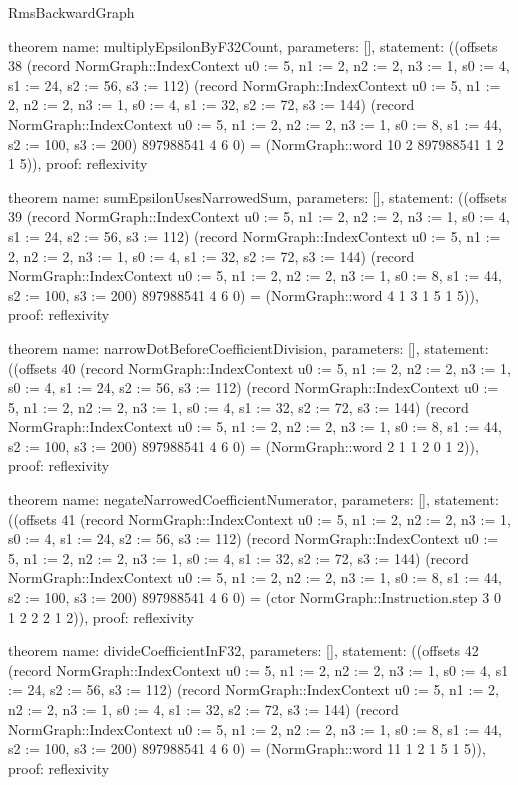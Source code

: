 \begin{lexlean}{RmsBackwardGraph}
\begin{semanticmodule}
theorem{
  name: multiplyEpsilonByF32Count,
  parameters: [],
  statement: ((offsets 38 (record NormGraph::IndexContext {u0 := 5, n1 := 2, n2 := 2, n3 := 1, s0 := 4, s1 := 24, s2 := 56, s3 := 112}) (record NormGraph::IndexContext {u0 := 5, n1 := 2, n2 := 2, n3 := 1, s0 := 4, s1 := 32, s2 := 72, s3 := 144}) (record NormGraph::IndexContext {u0 := 5, n1 := 2, n2 := 2, n3 := 1, s0 := 8, s1 := 44, s2 := 100, s3 := 200}) 897988541 4 6 0) = (NormGraph::word 10 2 897988541 1 2 1 5)),
  proof: reflexivity{}
}

theorem{
  name: sumEpsilonUsesNarrowedSum,
  parameters: [],
  statement: ((offsets 39 (record NormGraph::IndexContext {u0 := 5, n1 := 2, n2 := 2, n3 := 1, s0 := 4, s1 := 24, s2 := 56, s3 := 112}) (record NormGraph::IndexContext {u0 := 5, n1 := 2, n2 := 2, n3 := 1, s0 := 4, s1 := 32, s2 := 72, s3 := 144}) (record NormGraph::IndexContext {u0 := 5, n1 := 2, n2 := 2, n3 := 1, s0 := 8, s1 := 44, s2 := 100, s3 := 200}) 897988541 4 6 0) = (NormGraph::word 4 1 3 1 5 1 5)),
  proof: reflexivity{}
}

theorem{
  name: narrowDotBeforeCoefficientDivision,
  parameters: [],
  statement: ((offsets 40 (record NormGraph::IndexContext {u0 := 5, n1 := 2, n2 := 2, n3 := 1, s0 := 4, s1 := 24, s2 := 56, s3 := 112}) (record NormGraph::IndexContext {u0 := 5, n1 := 2, n2 := 2, n3 := 1, s0 := 4, s1 := 32, s2 := 72, s3 := 144}) (record NormGraph::IndexContext {u0 := 5, n1 := 2, n2 := 2, n3 := 1, s0 := 8, s1 := 44, s2 := 100, s3 := 200}) 897988541 4 6 0) = (NormGraph::word 2 1 1 2 0 1 2)),
  proof: reflexivity{}
}

theorem{
  name: negateNarrowedCoefficientNumerator,
  parameters: [],
  statement: ((offsets 41 (record NormGraph::IndexContext {u0 := 5, n1 := 2, n2 := 2, n3 := 1, s0 := 4, s1 := 24, s2 := 56, s3 := 112}) (record NormGraph::IndexContext {u0 := 5, n1 := 2, n2 := 2, n3 := 1, s0 := 4, s1 := 32, s2 := 72, s3 := 144}) (record NormGraph::IndexContext {u0 := 5, n1 := 2, n2 := 2, n3 := 1, s0 := 8, s1 := 44, s2 := 100, s3 := 200}) 897988541 4 6 0) = (ctor NormGraph::Instruction.step 3 0 1 2 2 2 1 2)),
  proof: reflexivity{}
}

theorem{
  name: divideCoefficientInF32,
  parameters: [],
  statement: ((offsets 42 (record NormGraph::IndexContext {u0 := 5, n1 := 2, n2 := 2, n3 := 1, s0 := 4, s1 := 24, s2 := 56, s3 := 112}) (record NormGraph::IndexContext {u0 := 5, n1 := 2, n2 := 2, n3 := 1, s0 := 4, s1 := 32, s2 := 72, s3 := 144}) (record NormGraph::IndexContext {u0 := 5, n1 := 2, n2 := 2, n3 := 1, s0 := 8, s1 := 44, s2 := 100, s3 := 200}) 897988541 4 6 0) = (NormGraph::word 11 1 2 1 5 1 5)),
  proof: reflexivity{}
}


\end{semanticmodule}
\end{lexlean}

